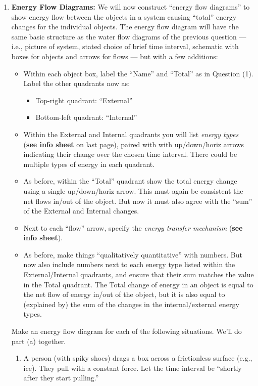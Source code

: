 \documentclass[12pt]{article}
\begin{document}
\begin{enumerate}
\item {\bf Energy Flow Diagrams:}  We will now construct ``energy flow diagrams'' to show energy flow between the objects in a system causing ``total'' energy changes for the individual objects.  The energy flow diagram will have the same basic structure as the water flow diagrams of the previous question --- i.e., picture of system, stated choice of brief time interval, schematic with boxes for objects and arrows for flows --- but with a few additions:
	\begin{itemize} 
	\item Within each object box, label the ``Name'' and ``Total'' as in Question (1). Label the other quadrants now as:
		\begin{itemize} 
		\item Top-right quadrant: ``External'' 
		\item Bottom-left quadrant: ``Internal''
		\end{itemize}
	\item Within the External and Internal quadrants you will list {\em energy types} ({\bf see info sheet} on last page), paired with with up/down/horiz arrows indicating their change over the chosen time interval.  There could be multiple types of energy in each quadrant. 
	\item As before, within the ``Total'' quadrant show the total energy change using a single up/down/horiz arrow.  This must again be consistent the net flows in/out of the object. But now it must also agree with the ``sum'' of the External and Internal changes.  
	\item Next to each ``flow'' arrow, specify the {\em energy transfer mechanism} ({\bf see info sheet}).
	\item As before, make things ``qualitatively quantitative'' with numbers. But now also include numbers next to each energy type listed within the External/Internal quadrants, and ensure that their sum matches the value in the Total quadrant. The Total change of energy in an object is equal to the net flow of energy in/out of the object, but it is also equal to (explained by) the sum of the changes in the internal/external energy types.
	\end{itemize}
Make an energy flow diagram for each of the following situations. We'll do part (a) together.
	\begin{enumerate}
	\item A person (with spiky shoes) drags a box across a frictionless surface (e.g., ice).  They pull with a constant force. Let the time interval be ``shortly after they start pulling.''

\end{enumerate}
\end{enumerate}
\end{document}
